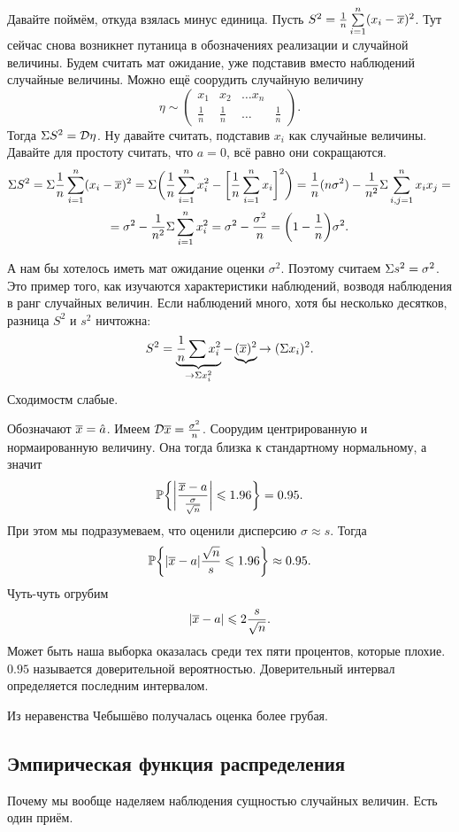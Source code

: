 Давайте поймём, откуда взялась минус единица. Пусть $S^2 = \frac1n \sum\limits_{i = 1}^{n}(x_i-\overline{x})^2$. Тут сейчас снова возникнет путаница в обозначениях реализации и случайной величины. Будем считать мат ожидание, уже подставив вместо наблюдений случайные величины. Можно ещё соорудить случайную величину
\[\eta\sim
\begin{pmatrix}
 x_1 & x_2 & \dots x_n\\
 \frac1n & \frac 1n & \dots & \frac1n
\end{pmatrix}.
\]
Тогда $\Sigma S^2 = \mathcal D \eta$. Ну давайте считать, подставив $x_i$ как случайные величины. Давайте для простоту считать, что $a=0$, всё равно они сокращаются.
\begin{multline*}
  \Sigma S^2 = \Sigma\frac1n \sum\limits_{i = 1}^{n} (x_i-\overline{x})^2 = \Sigma \bigg(\frac1n\sum\limits_{i = 1}^{n} x_i^2 - \bigg[\frac1n\sum\limits_{i = 1}^{n} x_i\bigg]^2\bigg) = \frac1n (n\sigma^2) - \frac1{n^2} \Sigma \sum\limits_{i,j=1}^n x_ix_j = \\
  = \sigma^2 - \frac1{n^2} \Sigma \sum\limits_{i = 1}^{n} x_i^2 = \sigma^2 - \frac{\sigma^2}n = \bigg(1-\frac1n\bigg)\sigma^2.
\end{multline*}

А нам бы хотелось иметь мат ожидание оценки $\sigma^2$. Поэтому считаем $\Sigma s^2 = \sigma^2$. Это пример того, как изучаются характеристики наблюдений, возводя наблюдения в ранг случайных величин. Если наблюдений много, хотя бы несколько десятков, разница $S^2$ и $s^2$ ничтожна:
\[
  S^2 = \underbrace{\frac 1n\sum x_i^2}_{\rightarrow\Sigma x_i^2} - \underbrace{(\overline{x})^2}{\rightarrow (\Sigma x_i)^2}.
\]
Сходимостм слабые.

Обозначают $\overline{x} = \hat a$. Имеем $\mathcal D \overline{x} = \frac{\sigma^2}n$. Соорудим центрированную и нормаированную величину. Она тогда близка к стандартному нормальному, а значит
\[
  \mathbb P \bigg\{\bigg|\frac{\overline{x} - a}{\frac{\sigma}{\sqrt{n}}}\bigg| \leqslant 1.96\bigg\} = 0.95.
\]
При этом мы подразумеваем, что оценили дисперсию $\sigma\approx s$. Тогда
\[
  \mathbb P\bigg\{|\overline{x} - a|\frac{\sqrt n}s \leqslant 1.96\bigg\} \approx 0.95.
\]
Чуть-чуть огрубим
\[
  |\overline{x} - a| \leqslant 2\frac s{\sqrt{n}}.
\]
Может быть наша выборка оказалась среди тех пяти процентов, которые плохие. $0.95$ называется доверительной вероятностью. Доверительный интервал определяется последним интервалом.

Из неравенства Чебышёво получалась оценка более грубая.

\subsection{Эмпирическая функция распределения}
Почему мы вообще наделяем наблюдения сущностью случайных величин.  Есть один приём.

